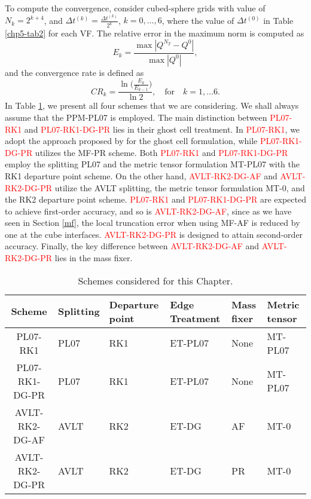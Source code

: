 To compute the convergence, consider cubed-sphere grids with value of $N_k =  2^{k+4}$,
and $\Delta t^{(k)} = \frac{\Delta t^{(k)}}{2^k}$, $k=0, \ldots, 6$, where
the value of $\Delta t^{(0)}$ in Table \ref{chp5-tab2} for each VF.
The relative error in the maximum norm is computed as
\begin{equation}
	E_k = \frac{\max |Q^{N_T} - Q^0|}{\max {|Q^0|}},
\end{equation}
and the convergence rate is defined as
\begin{equation*}
	CR_k = \frac{\ln{\bigg(\frac{E_{k}}{E_{k-1}}}\bigg)}{\ln 2}, \quad \text{for} \quad k = 1, \ldots 6.
\end{equation*}
In Table \ref{chp5-tab3}, we present all four schemes that we are considering. 
We shall always assume that the PPM-PL07 is employed. 
The main distinction between \textcolor{red}{PL07-RK1} and \textcolor{red}{PL07-RK1-DG-PR} lies in their ghost cell treatment.
In \textcolor{red}{PL07-RK1}, we adopt the approach proposed by \citet{putman:2007} for the ghost cell formulation,
while \textcolor{red}{PL07-RK1-DG-PR} utilizes the MF-PR scheme.
Both \textcolor{red}{PL07-RK1} and \textcolor{red}{PL07-RK1-DG-PR} employ the splitting PL07 and the metric tensor formulation MT-PL07 
with the RK1 departure point scheme. On the other hand, \textcolor{red}{AVLT-RK2-DG-AF} and \textcolor{red}{AVLT-RK2-DG-PR} utilize the AVLT splitting,
the metric tensor formulation MT-0, and the RK2 departure point scheme.
\textcolor{red}{PL07-RK1} and \textcolor{red}{PL07-RK1-DG-PR} are expected to achieve first-order accuracy, and so is \textcolor{red}{AVLT-RK2-DG-AF}, since as we have seen in Section \ref{mf},
the local truncation error when using MF-AF is reduced by one at the cube interfaces.
\textcolor{red}{AVLT-RK2-DG-PR} is designed
to attain second-order accuracy. Finally, the key difference between \textcolor{red}{AVLT-RK2-DG-AF} and \textcolor{red}{AVLT-RK2-DG-PR} lies in the mass fixer.
\begin{table}[!ht]
	\begin{tabular}{|c|l|l|l|l|l|}
		\hline
		Scheme & Splitting & Departure point & Edge Treatment & Mass fixer & Metric tensor\\ \hline
		PL07-RK1   & PL07 & RK1 & ET-PL07 & None & MT-PL07\\ \hline
		PL07-RK1-DG-PR   & PL07 & RK1 & ET-PL07 & None & MT-PL07\\ \hline
		AVLT-RK2-DG-AF   & AVLT & RK2 & ET-DG & AF & MT-0\\ \hline
		AVLT-RK2-DG-PR   & AVLT & RK2 & ET-DG & PR & MT-0\\ \hline
	\end{tabular}
	\caption{Schemes considered for this Chapter.}
	\label{chp5-tab3} 
\end{table}

